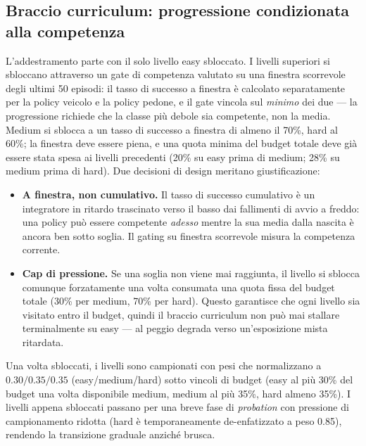 \subsection{Braccio curriculum: progressione condizionata alla competenza}
\label{sec:curriculum-arm}

L'addestramento parte con il solo livello easy sbloccato. I livelli
superiori si sbloccano attraverso un gate di competenza valutato su una
finestra scorrevole degli ultimi 50 episodi: il tasso di successo a
finestra è calcolato separatamente per la policy veicolo e la policy
pedone, e il gate vincola sul \emph{minimo} dei due --- la progressione
richiede che la classe più debole sia competente, non la media. Medium
si sblocca a un tasso di successo a finestra di almeno il 70\%, hard al
60\%; la finestra deve essere piena, e una quota minima del budget
totale deve già essere stata spesa ai livelli precedenti (20\% su easy
prima di medium; 28\% su medium prima di hard). Due decisioni di design
meritano giustificazione:

\begin{itemize}
  \item \textbf{A finestra, non cumulativo.} Il tasso di successo
        cumulativo è un integratore in ritardo trascinato verso il basso
        dai fallimenti di avvio a freddo: una policy può essere
        competente \emph{adesso} mentre la sua media dalla nascita è
        ancora ben sotto soglia. Il gating su finestra scorrevole misura
        la competenza corrente.
  \item \textbf{Cap di pressione.} Se una soglia non viene mai
        raggiunta, il livello si sblocca comunque forzatamente una volta
        consumata una quota fissa del budget totale (30\% per medium,
        70\% per hard). Questo garantisce che ogni livello sia visitato
        entro il budget, quindi il braccio curriculum non può mai
        stallare terminalmente su easy --- al peggio degrada verso
        un'esposizione mista ritardata.
\end{itemize}

Una volta sbloccati, i livelli sono campionati con pesi che normalizzano
a $0.30/0.35/0.35$ (easy/medium/hard) sotto vincoli di budget (easy al
più 30\% del budget una volta disponibile medium, medium al più 35\%,
hard almeno 35\%). I livelli appena sbloccati passano per una breve fase
di \emph{probation} con pressione di campionamento ridotta (hard è
temporaneamente de-enfatizzato a peso 0.85), rendendo la transizione
graduale anziché brusca.

